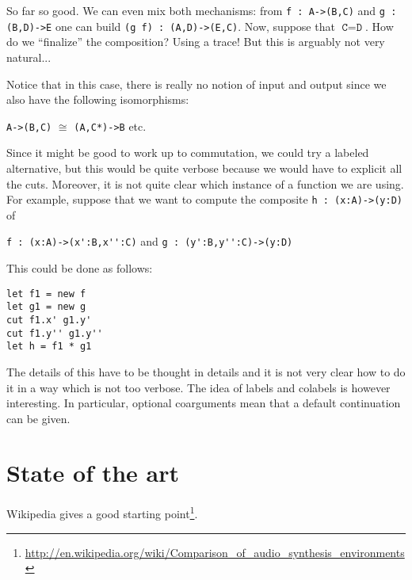 \documentclass[a4paper,titlepage]{article}
\begin{document}
So far so good. We can even mix both mechanisms: from \verb|f : A->(B,C)| and
\verb|g : (B,D)->E| one can build \verb|(g f) : (A,D)->(E,C)|. Now, suppose that
$\texttt{C}=\texttt{D}$. How do we ``finalize'' the composition? Using a trace!
But this is arguably not very natural...

Notice that in this case, there is really no notion of input and output since we
also have the following isomorphisms:
\begin{center}
  \verb|A->(B,C)|
  \qquad$\cong$\qquad
  \verb|(A,C*)->B|
  \qquad
  etc.
\end{center}

Since it might be good to work up to commutation, we could try a labeled
alternative, but this would be quite verbose because we would have to explicit
all the cuts. Moreover, it is not quite clear which instance of a function we
are using. For example, suppose that we want to compute the composite
\verb|h : (x:A)->(y:D)| of
\begin{center}
  \verb|f : (x:A)->(x':B,x'':C)|
  \qquad and\qquad
  \verb|g : (y':B,y'':C)->(y:D)|
\end{center}
This could be done as follows:
\begin{verbatim}
let f1 = new f
let g1 = new g
cut f1.x' g1.y'
cut f1.y'' g1.y''
let h = f1 * g1
\end{verbatim}
The details of this have to be thought in details and it is not very clear how
to do it in a way which is not too verbose. The idea of labels and colabels is
however interesting. In particular, optional coarguments mean that a default
continuation can be given.

\section{State of the art}
Wikipedia gives a good starting
point\footnote{\url{http://en.wikipedia.org/wiki/Comparison_of_audio_synthesis_environments}}.

\end{document}
